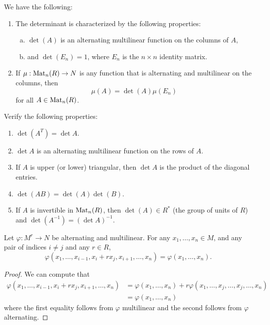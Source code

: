 \begin{corollary}
  \label{cor:alternating-is-determinant}
  We have the following:
  \begin{enumerate}
    \item The determinant is characterized by the
      following properties:
      \begin{enumerate}[(a)]
        \item $\det(A)$ is an alternating multilinear
          function on the columns of $A$,
        \item and $\det(E_n) = 1$, where $E_n$
          is the $n \times n$ identity matrix.
      \end{enumerate}
    \item If $\mu : \operatorname{Mat}_n(R) \to N$ is any function
      that is alternating and multilinear on the
      columns, then
      \[\mu(A) = \det(A) \mu(E_n)\]
      for all $A \in \operatorname{Mat}_n(R)$.
  \end{enumerate}
\end{corollary}

\begin{exercise}
  Verify the following properties:
  \begin{enumerate}
    \item $\det(A^T) = \det A$.
    \item $\det A$ is an alternating multilinear
      function on the rows of $A$.
    \item If $A$ is upper (or lower) triangular,
      then $\det A$ is the product of the diagonal
      entries.
    \item $\det(AB) = \det(A) \det(B)$.
    \item If $A$ is invertible
      in $\operatorname{Mat}_n(R)$, then $\det(A) \in R^*$ (the
      group of units of $R$) and
      $\det(A^{-1}) = (\det A) ^{-1}$.
  \end{enumerate}
\end{exercise}

\begin{lemma}
  Let $\varphi : M^r \to N$ be alternating and
  multilinear. For any $x_1, \dots, x_n \in M$, and
  any pair of indices $i \ne j$ and any
  $r \in R$,
  \[
    \varphi(x_1, \dots, x_{i - 1}, x_i + rx_j, x_{i + 1}, \dots, x_n) = \varphi(x_1, \dots, x_n).
  \]
\end{lemma}

\begin{proof}
  We can compute that
  \begin{align*}
    \varphi(x_1, \dots, x_{i - 1}, x_i + rx_j, x_{i + 1}, \dots, x_n)
    &= \varphi(x_1, \dots, x_n) + r \varphi(x_1, \dots, x_j, \dots, x_{j}, \dots, x_n) \\
    &= \varphi(x_1, \dots, x_n)
  \end{align*}
  where the first equality follows from $\varphi$
  multilinear and the second follows
  from $\varphi$ alternating.
\end{proof}


